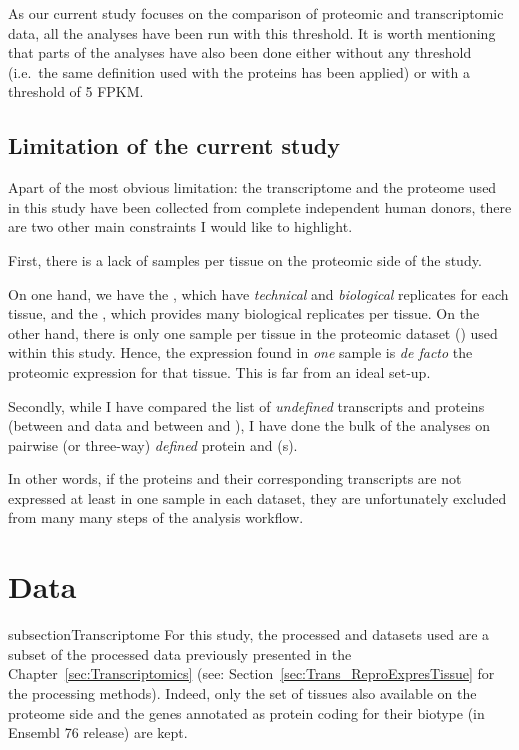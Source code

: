 As our current study focuses on the comparison of proteomic and transcriptomic
data, all the analyses have been run with this threshold. It is worth mentioning
that parts of the analyses have also been done either without
any threshold (i.e.\ the same definition used with the proteins has been applied)
or with a threshold of 5 \gls{FPKM}.


\subsection{Limitation of the current study}

Apart of the most obvious limitation: the transcriptome and the proteome used in
this study have been collected from complete independent human donors, there are
two other main constraints I would like to highlight.

First, there is a lack of samples per tissue on the proteomic side of the study.

On one hand, we have the , which have \emph{technical}
and \emph{biological} replicates for each tissue, and the , which
provides many biological replicates per tissue. On the other hand, there is only
one sample per tissue in the proteomic dataset () used
within this study. Hence, the expression found in \emph{one} sample is
\textit{de facto} the proteomic expression for that tissue. This
is far from an ideal set-up.


Secondly, while I have compared the list of \emph{undefined} transcripts and
proteins (between  and  data and
between  and ), I have done the bulk of the
analyses on pairwise (or three-way) \emph{defined} protein and \mRNA(s).

In other words, if the proteins and their corresponding transcripts are not
expressed at least in one sample in each dataset, they are unfortunately excluded
from many many steps of the analysis workflow.

\section{Data}
\label{sec:IntegrationData}

subsection{Transcriptome}
For this study, the processed  and  datasets
used are a subset of the processed data previously presented in the
Chapter~\ref{sec:Transcriptomics} (see: Section~\ref{sec:Trans_ReproExpresTissue}
for the processing methods). Indeed, only the set of tissues also available
on the proteome side and the genes annotated as protein coding for their
biotype (in Ensembl 76 release) are kept.

